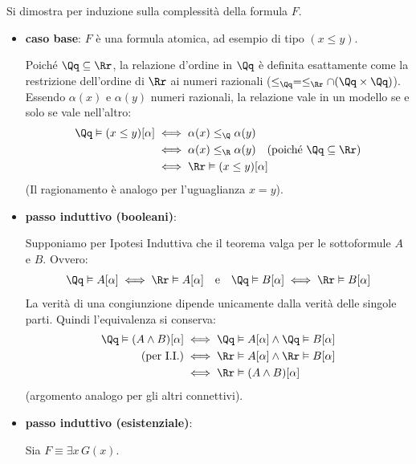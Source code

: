 \documentclass[a4paper,11pt]{report}
\begin{document}
\begin{proofframe}{}{}
    Si dimostra per induzione sulla complessità della formula \( F \).

    \begin{itemize}
        \item \textbf{caso base}: \( F \) è una formula atomica, ad esempio di tipo \( (x \leq y) \).
        
        Poiché \( \Qq \subseteq \Rr \), la relazione d'ordine in \( \Qq \) è definita esattamente come la restrizione dell'ordine di \( \Rr \) ai numeri razionali (\( \leq_\Qq = \leq_\Rr \cap (\Qq \times \Qq) \)). Essendo \( \alpha(x) \) e \( \alpha(y) \) numeri razionali, la relazione vale in un modello se e solo se vale nell'altro:
            \begin{align*}
                \Qq \vDash (x\leq y)[\alpha] &\iff \alpha(x) \leq_\Q \alpha(y) \\
                &\iff \alpha(x) \leq_\R \alpha(y) \quad (\text{poiché } \Qq \subseteq \Rr) \\
                &\iff \Rr \vDash (x\leq y)[\alpha] 
            \end{align*}
            (Il ragionamento è analogo per l'uguaglianza \( x = y \)).

        \item \textbf{passo induttivo (booleani)}:

        Supponiamo per Ipotesi Induttiva che il teorema valga per le sottoformule \( A \) e \( B \). Ovvero:
                \[
        \Qq \vDash A[\alpha] \iff \Rr \vDash A[\alpha] \quad \text{e} \quad \Qq \vDash B[\alpha] \iff \Rr \vDash B[\alpha]
        \]
        La verità di una congiunzione dipende unicamente dalla verità delle singole parti. Quindi l'equivalenza si conserva:
            \begin{align*}
                \Qq \vDash (A \land B) [\alpha] &\iff \Qq \vDash A[\alpha] \land \Qq \vDash B[\alpha] \\
                (\text{per I.I.}) &\iff \Rr \vDash A[\alpha] \land \Rr \vDash B[\alpha] \\
                &\iff \Rr \vDash (A \land B)[\alpha]
            \end{align*}
            (argomento analogo per gli altri connettivi).

        \item \textbf{passo induttivo (esistenziale)}:
        
            Sia \(F \equiv \exists x \, G(x)\). 


\end{itemize}
\end{proofframe}
\end{document}
